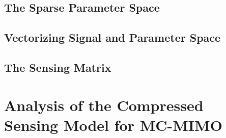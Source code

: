 \documentclass[12pt, a4paper]{scrreprt}
\begin{document}
  \subsection{The Sparse Parameter Space}
  \label{sub:The Sparse Parameter Space}

  \subsection{Vectorizing Signal and Parameter Space}
  \label{sub:Vectorizing Signal and Parameter Space}

  \subsection{The Sensing Matrix}
  \label{sub:The Sensing Matrix}

  \section{Analysis of the Compressed Sensing Model for MC-MIMO}
  \label{sec:Analysis of the Compressed Sensing Model for MC-MIMO}
\end{document}

